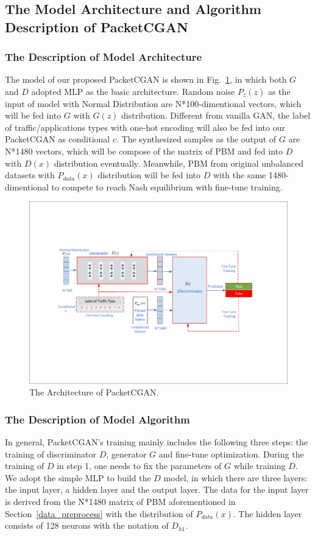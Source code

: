 \documentclass[conference]{IEEEtran}
\begin{document}
\subsection{The Model Architecture and Algorithm Description of PacketCGAN}\label{algorithm_description}
\subsubsection{The Description of Model Architecture}
The model of our proposed PacketCGAN is shown in Fig.~\ref{fig:pcgan_model}, in which both $G$ and $D$ adopted MLP as the basic architecture. Random noise $P_z(z)$ as the input of model with Normal Distribution are N*100-dimentional vectors, which will be fed into $G$ with $G(z)$ distribution. Different from vanilla GAN, the label of traffic/applications types with one-hot encoding will also be fed into our PacketCGAN as conditional $c$. The synthesized samples as the output of $G$ are N*1480 vectors, which will be compose of the matrix of PBM and fed into $D$ with $D(x)$ distribution eventually. Meanwhile, PBM from original unbalanced datasets with $P_{data}(x)$ distribution will be fed into $D$ with the same 1480-dimentional to compete to reach Nash equilibrium with fine-tune training.

\begin{figure}[ht!]
	\centering\includegraphics[width=3.3 in]{fig/PCGAN_architecture.pdf} 
	\caption{The Architecture of PacketCGAN.}\label{fig:pcgan_model} %
\end{figure}

\subsubsection{The Description of Model Algorithm}\label{model_algorithm}
In general, PacketCGAN's training mainly includes the following three steps: the training of discriminator $D$, generator $G$ and fine-tune optimization. During the training of $D$ in step 1, one needs to fix the parameters of $G$ while training $D$. We adopt the simple MLP to build the $D$ model, in which there are three layers: the input layer, a hidden layer and the output layer.  The data for the input layer is derived from the N*1480 matrix of  PBM aforementioned in Section~\ref{data_preprocess} with the distribution of $P_{data}(x)$. The hidden layer consists of 128 neurons with the notation of $D_{h1}$.
\end{document}
